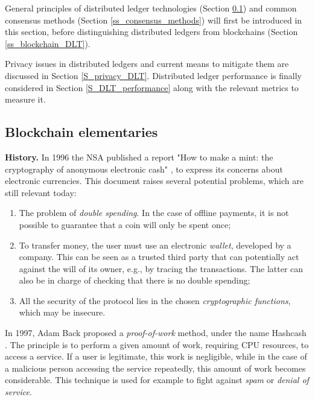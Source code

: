 General principles of distributed ledger technologies (Section \ref{ss_DLT_elementaries}) and common consensus methods (Section \ref{ss_consensus_methods}) will first be introduced in this section, before distinguishing distributed ledgers from blockchains (Section \ref{ss_blockchain_DLT}).

 Privacy issues in distributed ledgers and current means to mitigate them are discussed in Section \ref{S_privacy_DLT}. Distributed ledger performance is finally considered in Section \ref{S_DLT_performance} along with the relevant metrics to measure it.
\subsection{Blockchain elementaries}
\label{ss_DLT_elementaries}

\textbf{History.}
In 1996 the NSA published a report "How to make a mint: the cryptography
of anonymous electronic cash" \cite{Law1997}, to express its concerns about
electronic currencies. This document raises several potential problems, which
are still relevant today:
\begin{enumerate}
\item The problem of \emph{double spending}. In the case of offline payments, it is not possible to guarantee that a coin will only be spent once;
\item To transfer money, the user must use an electronic \emph{wallet}, developed by a company. This can be seen as a
trusted third party that can potentially act against the will of its owner, e.g., by tracing the transactions. The latter can also be in charge of checking that there is no double spending;
\item All the security of the protocol lies in the chosen \emph{cryptographic functions}, which may be insecure.
\end{enumerate}

In 1997, Adam Back proposed a \emph{proof-of-work} method, under the name
Hashcash \cite{Back2002}. The principle is to perform a given amount of work, requiring CPU resources, to access a service. If a user is legitimate, this work is negligible, while in the case of a malicious person
accessing the service repeatedly, this amount of work becomes considerable. This technique is used for example to fight against \emph{spam} or \emph{denial of service}.

